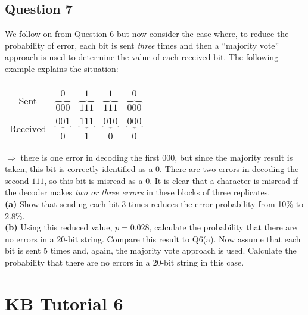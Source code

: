 \documentclass[]{article}
\begin{document}
\subsection*{Question 7}
We follow on from Question 6 but now consider the case where, to reduce the probability of error, each bit is sent \emph{three} times and then a ``majority vote'' approach is used to determine the value of each received bit. The following example explains the situation:\\[-0.5cm]
\begin{center}
	\begin{tabular}{ccccc}
		\hline
		&&&&\\[-0.3cm]
		\multirow{2}{*}{Sent} & $0$ & $1$ & $1$ & $0$ \\
		& $\overbrace{000}$ & $\overbrace{111}$ & $\overbrace{111}$ & $\overbrace{000}$ \\[0.2cm]
		\hline
		&&&&\\[-0.3cm]
		\multirow{2}{*}{Received} & $\underbrace{001}$ & $\underbrace{111}$ & $\underbrace{010}$ & $\underbrace{000}$ \\
		& $0$ & $1$ & $0$ & $0$ \\[0.2cm]
		\hline
	\end{tabular}
\end{center}
$\Rightarrow$ there is one error in decoding the first $000$, but since the majority result is taken, this bit is correctly identified as a $0$. There are two errors in decoding the second $111$, so this bit is misread as a $0$. It is clear that a character is misread if the decoder makes \emph{two or three errors} in these blocks of three replicates.\\[-0.2cm]

{\bf(a)} Show that sending each bit 3 times reduces the error probability from 10\% to 2.8\%. \quad\\ {\bf(b)} Using this reduced value, $p=0.028$, calculate the probability that there are no errors in a 20-bit string. Compare this result to Q6(a).  Now assume that each bit is sent 5 times and, again, the majority vote approach is used. Calculate the probability that there are no errors in a 20-bit string in this case. %

\newpage
\section{KB Tutorial 6}
\end{document}
